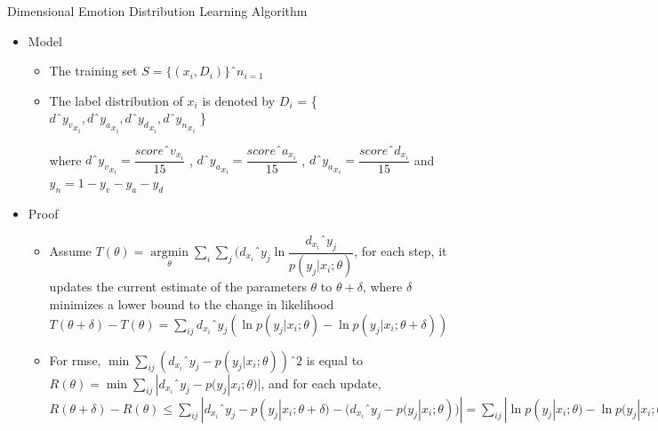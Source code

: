 \documentclass[
 size=14pt,
 paper=smartboard,  %
 mode=present, 		%
 display=slides, 	%
 style=tuliplab,  	%
 pauseslide,
 fleqn,leqno]{powerdot}
\begin{document}
	\begin{slide}{Dimensional Emotion Distribution Learning Algorithm}
	
	\begin{itemize}
		\item Model
		
		\begin{itemize}
			\item 
			The training set $ S = \{ ( x_{i} , D_{i} )  \} ˆn_{ i = 1 } $
			\item 
			The label distribution of $ x_{i}  $ is denoted by 
			$ D_{i} $ = \{ 
			$ d ˆ {y_{v}} _{ x_{i} } , 
			d ˆ {y_{a}} _{ x_{i} } ,
			d ˆ {y_{d}} _{ x_{i} } ,
			d ˆ {y_{n}} _{ x_{i} }  $ \}
			
			where $ d ˆ {y_{v}} _{ x_{i} }  = \dfrac{scoreˆ{v}_{ x_{i} }} {15} $ , 
			$ d ˆ {y_{a}} _{ x_{i} }  = \dfrac{scoreˆ{a}_{ x_{i} }} {15} $ ,
			$d ˆ {y_{a}} _{ x_{i} }= \dfrac{scoreˆ{d}_{ x_{i} }}{15} $ 
			and $ y_{n} = 1 - y_{v}  - y_{a} - y_{d} $
		\end{itemize}
		
		\item 
		Proof
		
		\begin{itemize}
			\item 
			Assume $ T(\theta) =  \mathop{\arg\min}\limits_{\theta}
			\sum\limits_{i}
			\sum\limits_{j}
			( d_{ x_{ i } } ˆ{ y_{ j } }
			\ln \dfrac{ d_{ x_{ i } } ˆ{ y_{ j } } }{ p( y_{ j } | x_{ i } ;{\theta}) } $,
			for each step, it updates the current estimate of the parameters 
			\textbf{$\theta$} to \textbf{ $\theta + \delta$},
			where \textbf{$ \delta $} minimizes a lower bound to the change in likelihood
			$ T(\theta + \delta) - T(\theta) = \sum\limits_{ij} 
			d_{ x_{ i } } ˆ{ y_{ j } } (
			\ln p( y_{ j } | x_{ i } ;{\theta}) -
			\ln p( y_{ j } | x_{ i } ;{\theta + \delta}) )$
			
			\item 
			For rmse,
			$ \mathop{\min}\sum\limits_{ij}
			(d_{ x_{ i } } ˆ{ y_{ j } }  - 
			p( y_{ j } | x_{ i } ;{\theta}))ˆ2$
			is equal to 
			$ R(\theta) = \mathop{\min} \sum\limits_{ij}
			|d_{ x_{ i } } ˆ{ y_{ j } }  - 
			p( y_{ j } | x_{ i } ;{\theta})| $,
			and for each update,
			$ R(\theta + \delta) - R(\theta) 
			\leq  
			\sum\limits_{ij} |
			d_{ x_{ i } } ˆ{ y_{ j } }  - 
			p( y_{ j } | x_{ i } ;{\theta + \delta}) - 
			(d_{ x_{ i } } ˆ{ y_{ j } }  - 
			p( y_{ j } | x_{ i } ;{\theta})) | =
			\sum\limits_{ij}
			| \ln p( y_{ j } | x_{ i } ;{\theta}) -
			\ln p( y_{ j } | x_{ i } ;{\theta + \delta}) |$
			
		\end{itemize}
	\end{itemize}
	
\end{slide}
\end{document}
